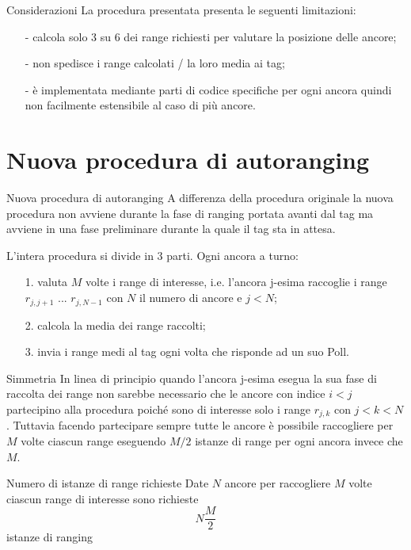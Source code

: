 \begin{frame}{Considerazioni}
  La procedura presentata presenta le seguenti limitazioni:
  \begin{itemize}
  \item [-] calcola solo 3 su 6 dei range richiesti per valutare la posizione delle ancore;
  \item [-] non spedisce i range calcolati / la loro media ai tag;
  \item [-] è implementata mediante parti di codice specifiche per ogni ancora quindi \alert{non}
    facilmente estensibile al caso di più ancore.
  \end{itemize}
\end{frame}

\section{Nuova procedura di autoranging}

\begin{frame}{Nuova procedura di autoranging}
  A differenza della procedura originale la nuova procedura \alert{non} avviene durante la fase
  di ranging portata avanti dal tag ma avviene in una fase preliminare durante la quale il tag sta in
  attesa.
  \par
  L'intera procedura si divide in 3 parti. Ogni ancora \alert{a turno}: 
  \begin{itemize}
  \item [1.] valuta $M$ volte i range di interesse, i.e. l'ancora
    j-esima raccoglie i range $r_{j,j+1}$ ... $r_{j,N-1}$ con $N$ il numero di ancore e $j<N$;
  \item [2.] calcola la media dei range raccolti;
  \item [3.] invia i range medi al tag ogni volta che risponde ad un suo Poll.
  \end{itemize}
\end{frame}

\begin{frame}{Simmetria}
  In linea di principio quando l'ancora j-esima esegua la sua fase di raccolta dei range non sarebbe
  necessario che le ancore con indice $i < j$ partecipino alla procedura poiché sono di interesse solo
  i range $r_{j,k}$ con $j < k < N$. Tuttavia facendo partecipare sempre tutte le ancore è possibile
  raccogliere per $M$ volte ciascun range eseguendo $M/2$ istanze di range per ogni ancora invece che $M$.

  \begin{exampleblock}{Numero di istanze di range richieste}
    Date $N$ ancore per raccogliere $M$ volte ciascun range di interesse sono richieste
    \[
    N \frac{M}{2}
    \]
    istanze di ranging
  \end{exampleblock}
\end{frame}

